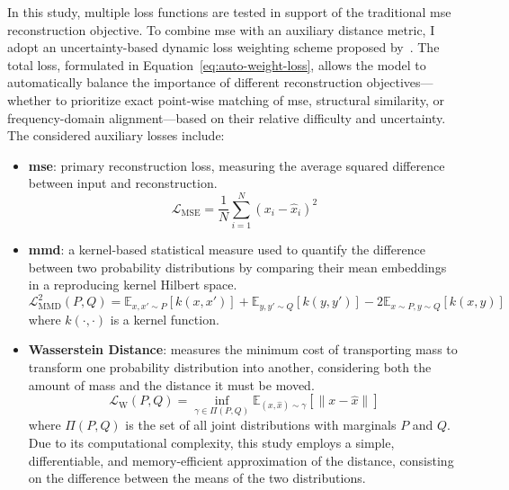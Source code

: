 In this study, multiple loss functions are tested in support of the traditional \gls{mse} reconstruction objective.
To combine \gls{mse} with an auxiliary distance metric, I adopt an uncertainty-based dynamic loss weighting scheme proposed by~\cite{yao_svd-ae_2024}.
The total loss, formulated in Equation~\ref{eq:auto-weight-loss}, allows the model to automatically balance the importance of different reconstruction objectives—whether to prioritize exact point-wise matching of \gls{mse}, structural similarity, or frequency-domain alignment—based on their relative difficulty and uncertainty.
The considered auxiliary losses include:

\begin{itemize}
    \item \textbf{\gls{mse}}: primary reconstruction loss, measuring the average squared difference between input and reconstruction.
    \begin{equation}
    \mathcal{L}_{\text{MSE}} = \frac{1}{N} \sum_{i=1}^{N} (x_i - \hat{x}_i)^2
    \end{equation}

    \item \textbf{\gls{mmd}}: a kernel-based statistical measure used to quantify the difference between two probability distributions by comparing their mean embeddings in a reproducing kernel Hilbert space.
    \begin{equation}
        \mathcal{L}_{\text{MMD}}^2(P, Q) = \mathbb{E}_{x, x' \sim P}[k(x,x')] + \mathbb{E}_{y, y' \sim Q}[k(y,y')] - 2\mathbb{E}_{x \sim P, y \sim Q}[k(x,y)]
        \label{eq:mmd}
    \end{equation}
    where \(k(\cdot, \cdot)\) is a kernel function.


    \item \textbf{Wasserstein Distance}: measures the minimum cost of transporting mass to transform one probability distribution into another, considering both the amount of mass and the distance it must be moved.
    \begin{equation}
        \mathcal{L}_{\text{W}}(P, Q) = \inf_{\gamma \in \Pi(P, Q)} \mathbb{E}_{(x,\hat{x}) \sim \gamma} [\| x - \hat{x} \|]
        \label{eq:wasserstein}
    \end{equation}
    where \(\Pi(P, Q)\) is the set of all joint distributions with marginals \(P\) and \(Q\).
    Due to its computational complexity, this study employs a simple, differentiable, and memory-efficient approximation of the distance, consisting on the difference between the means of the two distributions.


\end{itemize}
